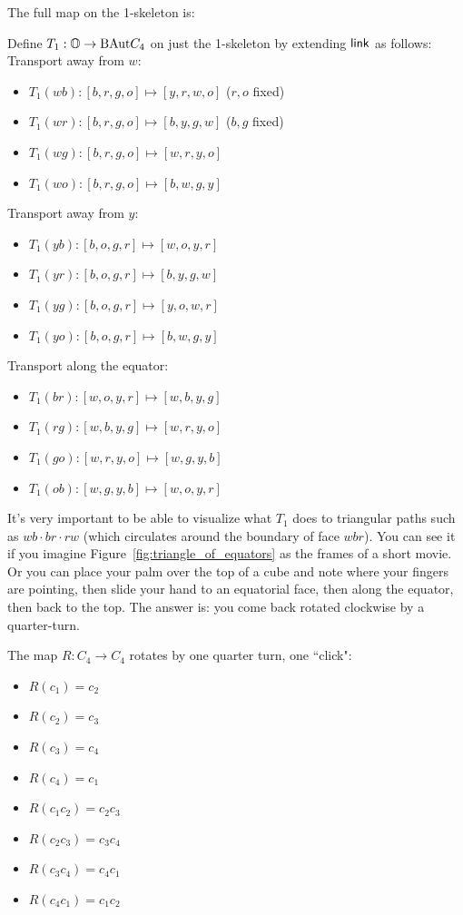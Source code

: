 The full map on the 1-skeleton is:
\begin{mydef}
Define \( T_1:\mathbb{O}\to\mathrm{BAut} C_4 \) on just the 1-skeleton by extending \( \mathsf{link} \) as follows:
Transport away from \( w \):
\begin{itemize}
\item \( T_1(wb):[b, r, g, o]\mapsto [y, r, w, o] \) (\( r, o \) fixed)
\item \( T_1(wr):[b, r, g, o]\mapsto [b, y, g, w] \) (\( b, g \) fixed)
\item \( T_1(wg):[b, r, g, o]\mapsto [w, r, y, o] \)
\item \( T_1(wo):[b, r, g, o]\mapsto [b, w, g, y] \)
\end{itemize}
Transport away from \( y \):
\begin{itemize}
\item \( T_1(yb):[b, o, g, r]\mapsto [w, o, y, r] \)
\item \( T_1(yr):[b, o, g, r]\mapsto [b, y, g, w] \)
\item \( T_1(yg):[b, o, g, r]\mapsto [y, o, w, r] \)
\item \( T_1(yo):[b, o, g, r]\mapsto [b, w, g, y] \)
\end{itemize}
Transport along the equator:
\begin{itemize}
\item \( T_1(br):[w, o, y, r]\mapsto [w, b, y, g] \) 
\item \( T_1(rg):[w, b, y, g]\mapsto [w, r, y, o] \)
\item \( T_1(go):[w, r, y, o]\mapsto [w, g, y, b] \)
\item \( T_1(ob):[w, g, y, b]\mapsto [w, o, y, r] \)
\end{itemize}
\end{mydef}

It's very important to be able to visualize what \( T_1 \) does to triangular paths such as \( wb\cdot br\cdot rw \) (which circulates around the boundary of face \( wbr \)). You can see it if you imagine Figure~\ref{fig:triangle_of_equators} as the frames of a short movie. Or you can place your palm over the top of a cube and note where your fingers are pointing, then slide your hand to an equatorial face, then along the equator, then back to the top. The answer is: you come back rotated clockwise by a quarter-turn. 

\begin{mydef}
The map \( R:C_4\to C_4 \) rotates by one quarter turn, one ``click":
\begin{itemize}
\item \( R(c_1) = c_2 \)
\item \( R(c_2) = c_3 \)
\item \( R(c_3) = c_4 \)
\item \( R(c_4) = c_1 \)
\item \( R(c_1c_2) = c_2c_3 \)
\item \( R(c_2c_3) = c_3c_4 \)
\item \( R(c_3c_4) = c_4c_1 \)
\item \( R(c_4c_1) = c_1c_2 \)
\end{itemize}
\end{mydef}

